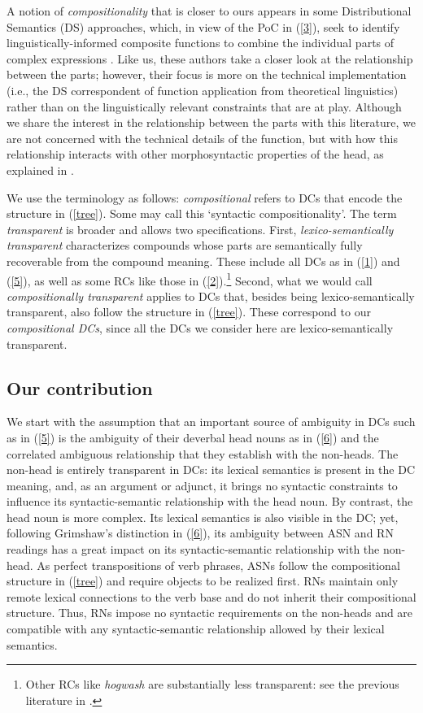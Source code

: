 \documentclass[output=paper]{langsci/langscibook}
\begin{document}
 A notion of \textit{compositionality} that is closer to ours appears in some Distributional Semantics (DS) approaches, which, in view of the PoC in (\ref{3}), seek to identify linguistically-informed composite functions to combine the individual parts of complex expressions \citep{marelli:baroni:15,baroni:zamparelli:10}. Like us, these authors take a closer look at the relationship between the parts; however, their focus is more on the technical implementation (i.e., the DS correspondent of function application from theoretical linguistics) rather than on the linguistically relevant constraints that are at play. Although we share the interest in the relationship between the parts with this literature, we are not concerned with the technical details of the function, but with how this relationship interacts with other morphosyntactic properties of the head, as explained in .

We use the terminology as follows: \textit{compositional} refers to DCs that encode the structure in (\ref{tree}). Some may call this \lq syntactic compositionality\rq. The term \textit{transparent} is broader and allows two specifications. First,  \textit{lexico-semantically transparent}  characterizes compounds whose parts are semantically fully recoverable from the compound meaning. These include all DCs as in (\ref{1}) and (\ref{5}), as well as some RCs like those in (\ref{2}).\footnote{Other RCs like \textit{hogwash} are substantially less transparent: see the previous literature in .}  Second, 
what we would call \textit{compositionally transparent} applies to DCs that, besides being lexico-semantically transparent, also follow the structure in (\ref{tree}). These correspond to our \textit{compositional DCs}, since all the DCs we consider here are lexico-semantically transparent.



\subsection{Our contribution}\label{sec:intro:contribution}
 We start with the assumption that an important source of ambiguity  in DCs such as in (\ref{5}) is the ambiguity of their deverbal head nouns as in (\ref{6}) and the correlated ambiguous relationship that they establish with the non-heads.  The non-head is entirely transparent in DCs: its lexical semantics is present in the DC meaning, and, as an argument or adjunct, it brings no syntactic constraints to influence its syntactic-semantic relationship with the head noun. By contrast, the head noun is more complex. Its lexical semantics is also visible in the DC; yet, following Grimshaw's distinction in (\ref{6}), its ambiguity between ASN and RN readings has a great impact on its syntactic-semantic relationship with the non-head. As perfect  transpositions of verb phrases, ASNs follow the compositional structure in (\ref{tree}) and require objects to be realized first. RNs maintain only remote lexical connections to the verb base and do not inherit their compositional structure. Thus, RNs impose no syntactic requirements on the non-heads and are compatible with any syntactic-semantic relationship allowed by their lexical semantics.
\end{document}
